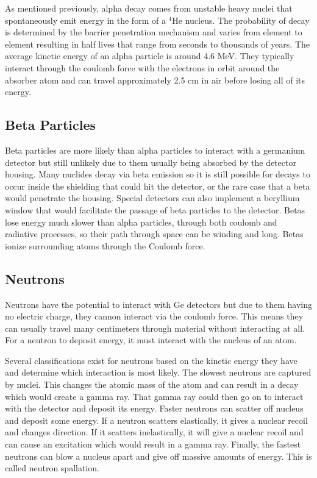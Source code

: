 As mentioned previously, alpha decay comes from unstable heavy nuclei that spontaneously emit energy in the form of a $^{4}$He nucleus.
The probability of decay is determined by the barrier penetration mechanism and varies from element to element resulting in half lives that range from seconds to thousands of years.
The average kinetic energy of an alpha particle is around 4.6 MeV.
They typically interact through the coulomb force with the electrons in orbit around the absorber atom and can travel approximately 2.5 cm in air before losing all of its energy.

\subsection{Beta Particles}
Beta particles are more likely than alpha particles to interact with a germanium detector but still unlikely due to them usually being absorbed by the detector housing.
Many nuclides decay via beta emission so it is still possible for decays to occur inside the shielding that could hit the detector, or the rare case that a beta would penetrate the housing.
Special detectors can also implement a beryllium window that would facilitate the passage of beta particles to the detector.
Betas lose energy much slower than alpha particles, through both coulomb and radiative processes, so their path through space can be winding and long.
Betas ionize surrounding atoms through the Coulomb force.


\subsection{Neutrons}
Neutrons have the potential to interact with Ge detectors but due to them having no electric charge, they cannon interact via the coulomb force.
This means they can usually travel many centimeters through material without interacting at all.
For a neutron to deposit energy, it must interact with the nucleus of an atom.

Several classifications exist for neutrons based on the kinetic energy they have and determine which interaction is most likely.
The slowest neutrons are captured by nuclei.
This changes the atomic mass of the atom and can result in a decay which would create a gamma ray.
That gamma ray could then go on to interact with the detector and deposit its energy.
Faster neutrons can scatter off nucleus and deposit some energy.
If a neutron scatters elastically, it gives a nuclear recoil and changes direction.
If it scatters inelastically, it will give a nuclear recoil and can cause an excitation which would result in a gamma ray.
Finally, the fastest neutrons can blow a nucleus apart and give off massive amounts of energy. This is called neutron spallation.

